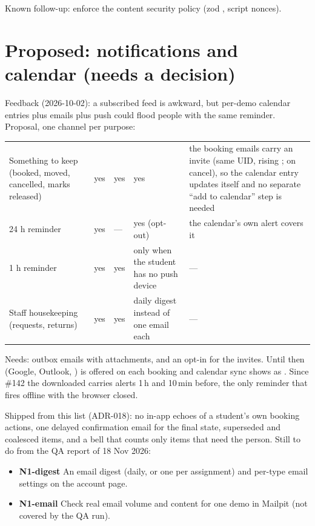 Known follow-up: enforce the content security policy (zod , script nonces).

\section{Proposed: notifications and calendar (needs a decision)}

Feedback (2026-10-02): a subscribed feed is awkward, but per-demo calendar entries plus emails plus push could flood people with the same reminder. Proposal, one channel per purpose:

{\tablefont
\begin{xltabular}{\linewidth}{@{}P{30mm} P{16mm} P{30mm} P{30mm} L@{}}
  \toprule
   &  &  &  & \\
  \midrule
  \endhead
  Something to keep (booked, moved, cancelled, marks released) & yes & yes & yes & the booking emails carry an  invite (same UID, rising ;  on cancel), so the calendar entry updates itself and no separate ``add to calendar'' step is needed\\
  24 h reminder & yes & --- & yes (opt-out) & the calendar's own alert covers it\\
  1 h reminder & yes & yes & only when the student has no push device & ---\\
  Staff housekeeping (requests, returns) & yes & yes & daily digest instead of one email each & ---\\
  \bottomrule
\end{xltabular}}

Needs: outbox emails with attachments, and an opt-in for the invites. Until then  (Google, Outlook, ) is offered on each booking and calendar sync shows as . Since \#142 the downloaded  carries alerts 1\,h and 10\,min before, the only reminder that fires offline with the browser closed.

Shipped from this list (ADR-018): no in-app echoes of a student's own booking actions, one delayed
confirmation email for the final state, superseded and coalesced items, and a bell that counts only
items that need the person. Still to do from the QA report of 18 Nov 2026:
\begin{itemize}
  \item \textbf{N1-digest} An email digest (daily, or one per assignment) and per-type email
    settings on the account page.
  \item \textbf{N1-email} Check real email volume and content for one demo in Mailpit (not covered
    by the QA run).
\end{itemize}

